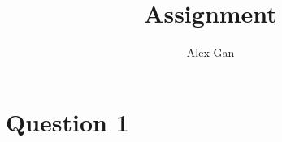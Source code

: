 \documentclass{article}
\title{Assignment}
\author{Alex Gan}
\begin{document}
\maketitle

\section{Question 1}


% 

% 

% 

% 

% 

% 
\end{document}
